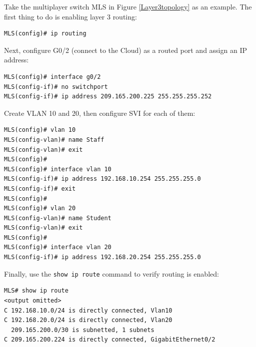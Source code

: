 Take the multiplayer switch MLS in Figure \ref{Layer3topology} as an example. The first thing to do is enabling layer 3 routing:

\begin{verbatim}
MLS(config)# ip routing
\end{verbatim}

Next, configure G0/2 (connect to the Cloud) as a routed port and assign an IP address:

\begin{verbatim}
MLS(config)# interface g0/2
MLS(config-if)# no switchport
MLS(config-if)# ip address 209.165.200.225 255.255.255.252
\end{verbatim}

Create VLAN 10 and 20, then configure SVI for each of them:

\begin{verbatim}
MLS(config)# vlan 10
MLS(config-vlan)# name Staff
MLS(config-vlan)# exit
MLS(config)# 
MLS(config)# interface vlan 10
MLS(config-if)# ip address 192.168.10.254 255.255.255.0
MLS(config-if)# exit
MLS(config)# 
MLS(config)# vlan 20
MLS(config-vlan)# name Student
MLS(config-vlan)# exit
MLS(config)# 
MLS(config)# interface vlan 20
MLS(config-if)# ip address 192.168.20.254 255.255.255.0
\end{verbatim}

Finally, use the \verb|show ip route| command to verify routing is enabled:

\begin{verbatim}
MLS# show ip route
<output omitted>
C 192.168.10.0/24 is directly connected, Vlan10
C 192.168.20.0/24 is directly connected, Vlan20
  209.165.200.0/30 is subnetted, 1 subnets
C 209.165.200.224 is directly connected, GigabitEthernet0/2
\end{verbatim}